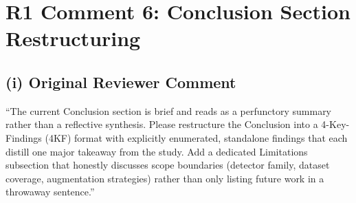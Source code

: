 \documentclass[conference]{IEEEtran}
\begin{document}
\section*{R1 Comment 6: Conclusion Section Restructuring}

\subsection*{(i) Original Reviewer Comment}
``The current Conclusion section is brief and reads as a perfunctory summary rather than a reflective synthesis. Please restructure the Conclusion into a 4-Key-Findings (4KF) format with explicitly enumerated, standalone findings that each distill one major takeaway from the study. Add a dedicated Limitations subsection that honestly discusses scope boundaries (detector family, dataset coverage, augmentation strategies) rather than only listing future work in a throwaway sentence.''
\end{document}

